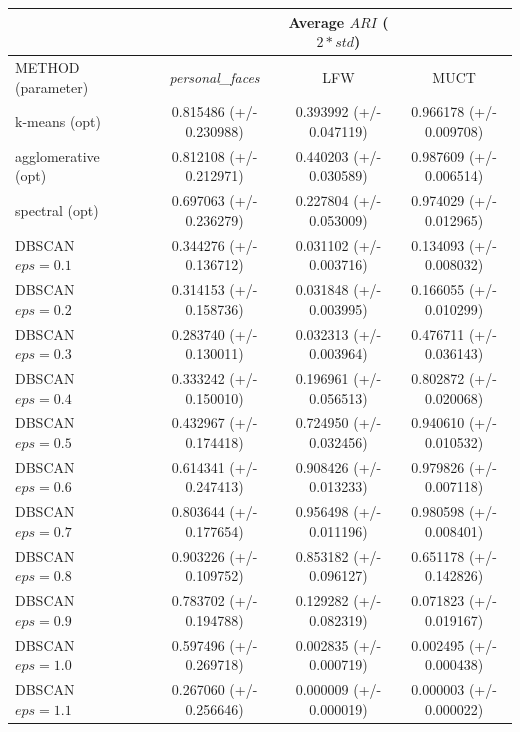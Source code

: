 \documentclass[conference]{IEEEtran}
\begin{document}
\begin{table}[t]
  \centering
  \begin{tabular}{ | l*{4}{c} | }
    \hline
                         & \vline &                          & Average $ARI$ ($2*std$) &     \\
    \hline
    METHOD (parameter)   & \vline & \textit{personal\_faces} & LFW                    & MUCT \\
    \hline
    k-means (opt)        & \vline & 0.815486 (+/- 0.230988) & 0.393992 (+/- 0.047119) & 0.966178 (+/- 0.009708) \\
    agglomerative (opt)  & \vline & 0.812108 (+/- 0.212971) & 0.440203 (+/- 0.030589) & 0.987609 (+/- 0.006514) \\
    spectral (opt)       & \vline & 0.697063 (+/- 0.236279) & 0.227804 (+/- 0.053009) & 0.974029 (+/- 0.012965) \\
    \hline
    DBSCAN $eps = 0.1$   & \vline & 0.344276 (+/- 0.136712) & 0.031102 (+/- 0.003716) & 0.134093 (+/- 0.008032) \\
    DBSCAN $eps = 0.2$   & \vline & 0.314153 (+/- 0.158736) & 0.031848 (+/- 0.003995) & 0.166055 (+/- 0.010299) \\
    DBSCAN $eps = 0.3$   & \vline & 0.283740 (+/- 0.130011) & 0.032313 (+/- 0.003964) & 0.476711 (+/- 0.036143) \\
    DBSCAN $eps = 0.4$   & \vline & 0.333242 (+/- 0.150010) & 0.196961 (+/- 0.056513) & 0.802872 (+/- 0.020068) \\
    DBSCAN $eps = 0.5$   & \vline & 0.432967 (+/- 0.174418) & 0.724950 (+/- 0.032456) & 0.940610 (+/- 0.010532) \\
    DBSCAN $eps = 0.6$   & \vline & 0.614341 (+/- 0.247413) & 0.908426 (+/- 0.013233) & 0.979826 (+/- 0.007118) \\
    DBSCAN $eps = 0.7$   & \vline & 0.803644 (+/- 0.177654) & 0.956498 (+/- 0.011196) & 0.980598 (+/- 0.008401) \\
    DBSCAN $eps = 0.8$   & \vline & 0.903226 (+/- 0.109752) & 0.853182 (+/- 0.096127) & 0.651178 (+/- 0.142826) \\
    DBSCAN $eps = 0.9$   & \vline & 0.783702 (+/- 0.194788) & 0.129282 (+/- 0.082319) & 0.071823 (+/- 0.019167) \\
    DBSCAN $eps = 1.0$   & \vline & 0.597496 (+/- 0.269718) & 0.002835 (+/- 0.000719) & 0.002495 (+/- 0.000438) \\
    DBSCAN $eps = 1.1$   & \vline & 0.267060 (+/- 0.256646) & 0.000009 (+/- 0.000019) & 0.000003 (+/- 0.000022) \\

\end{tabular}
\end{table}
\end{document}
